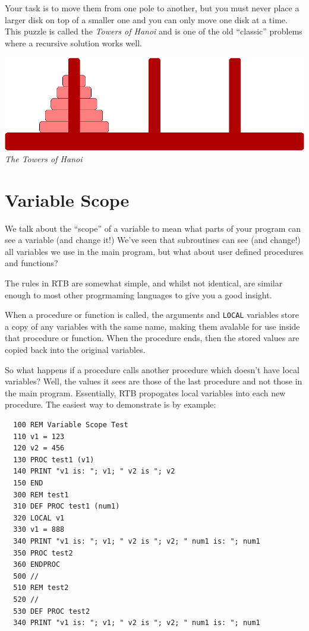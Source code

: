 Your task is to move them from one pole to another, but you must
never place a larger disk on top of a smaller one and you can only
move one disk at a time. This puzzle is called the {\sl Towers of
Hanoi} and is one of the old ``classic''
problems where a recursive solution works well.
\noindent
\begin{center}
{\includegraphics{hanoi.eps}}\\{\sl The Towers of Hanoi}
\end{center}

\section{Variable Scope}
We talk about the ``scope'' of a variable to mean what parts of your
program can see a variable (and change it!) We've seen that subroutines
can see (and change!) all variables we use in the main program, but what
about user defined procedures and functions?

The rules in RTB are somewhat simple, and whilst not identical, are
similar enough to most other progrmaming languages to give you a good
insight.

When a procedure or function is called, the arguments and {\tt LOCAL}
variables store a copy of any variables with the same name, making them
avalable for use inside that procedure or function. When the procedure
ends, then the stored values are copied back into the original variables.

So what happens if a procedure calls another procedure which doesn't
have local variables? Well, the values it sees are those of the last
procedure and not those in the main program. Essentially, RTB propogates
local variables into each new procedure. The easiest way to demonstrate is
by example:
\begin{verbatim}
  100 REM Variable Scope Test
  110 v1 = 123
  120 v2 = 456
  130 PROC test1 (v1)
  140 PRINT "v1 is: "; v1; " v2 is "; v2
  150 END
  300 REM test1
  310 DEF PROC test1 (num1)
  320 LOCAL v1
  330 v1 = 888
  340 PRINT "v1 is: "; v1; " v2 is "; v2; " num1 is: "; num1
  350 PROC test2
  360 ENDPROC
  500 //
  510 REM test2
  520 //
  530 DEF PROC test2
  340 PRINT "v1 is: "; v1; " v2 is "; v2; " num1 is: "; num1
\end{verbatim}

